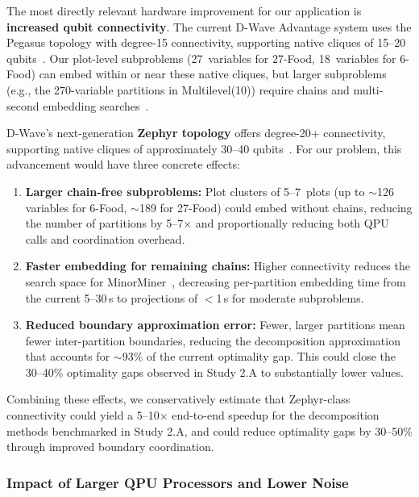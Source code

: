 \documentclass{oqireport}
\begin{document}
The most directly relevant hardware improvement for our application is \textbf{increased qubit connectivity}. The current D-Wave Advantage system uses the Pegasus topology with degree-15 connectivity, supporting native cliques of 15--20 qubits~\cite{boothby2020next}. Our plot-level subproblems (27~variables for 27-Food, 18~variables for 6-Food) can embed within or near these native cliques, but larger subproblems (e.g., the 270-variable partitions in Multilevel(10)) require chains and multi-second embedding searches~\cite{cai2014practical}.

D-Wave's next-generation \textbf{Zephyr topology} offers degree-20+ connectivity, supporting native cliques of approximately 30--40 qubits~\cite{boothby2021zephyr}. For our problem, this advancement would have three concrete effects:

\begin{enumerate}
    \item \textbf{Larger chain-free subproblems:} Plot clusters of 5--7~plots (up to $\sim$126 variables for 6-Food, $\sim$189 for 27-Food) could embed without chains, reducing the number of partitions by 5--7$\times$ and proportionally reducing both QPU calls and coordination overhead.

    \item \textbf{Faster embedding for remaining chains:} Higher connectivity reduces the search space for MinorMiner~\cite{cai2014practical}, decreasing per-partition embedding time from the current 5--30\,s to projections of $<$1\,s for moderate subproblems.

    \item \textbf{Reduced boundary approximation error:} Fewer, larger partitions mean fewer inter-partition boundaries, reducing the decomposition approximation that accounts for $\sim$93\% of the current optimality gap. This could close the 30--40\% optimality gaps observed in Study 2.A to substantially lower values.
\end{enumerate}

Combining these effects, we conservatively estimate that Zephyr-class connectivity could yield a 5--10$\times$ end-to-end speedup for the decomposition methods benchmarked in Study 2.A, and could reduce optimality gaps by 30--50\% through improved boundary coordination.

\subsubsection{Impact of Larger QPU Processors and Lower Noise}
\end{document}
